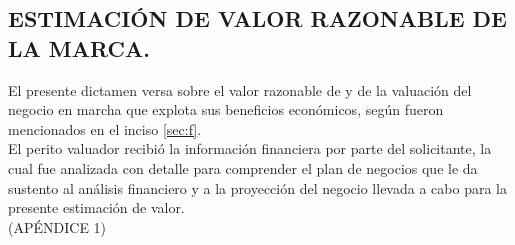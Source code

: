 \subsection{ESTIMACI\'ON DE VALOR RAZONABLE DE LA MARCA.} 

El presente dictamen versa sobre el valor razonable de \textcolor{principal}{\bienesValuados} y de la valuaci\'on del negocio en marcha que explota sus beneficios econ\'omicos, seg\'un fueron mencionados en el inciso \autoref{sec:f}.\\[10pt]

El perito valuador recibi\'o la informaci\'on financiera por parte del solicitante, la cual fue analizada con detalle para comprender el plan de negocios  que le da sustento al an\'alisis financiero y a la proyecci\'on del negocio llevada a cabo para la presente estimaci\'on de valor.\\[10pt] (\textcolor{terciario}{AP\'ENDICE 1})


